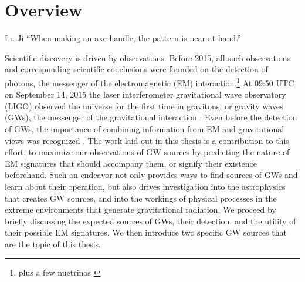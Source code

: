 \chapter[Overview]{Overview} \label{ch:intro}
%
%
%
%
%
%
%
%
\vspace{-16pt} \begin{chapquote}{Lu Ji} \singlespacing ``When making an axe handle, the pattern is near at hand.'' 
 \end{chapquote} \vspace{-8pt}
\noindent\makebox[\linewidth]{\rule{0.5\textwidth}{0.5pt}} \vspace{1pt}

Scientific discovery is driven by observations. Before 2015, all such
observations and corresponding scientific conclusions were founded on the
detection of photons, the messenger of the electromagnetic (EM)
interaction.\footnote{
plus a few nuetrinos
\citep{Haxton:SolarNeutrinos:2013, Hirata:1987, Bionta:1987, ICECUBE:2013:detection}
} 
At 09:50 UTC on September 14, 2015 the laser interferometer gravitational wave
observatory (LIGO) observed the universe for the first time in gravitons, or
gravity waves (GWs), the messenger of the gravitational interaction
\citep{GW150914:2016}. Even before the detection of GWs, the importance of
combining information from EM and gravitational views was recognized
\citep[\textit{e.g.}][]{ThorneBraginsky:1976,Phinney:2009}. The
work laid out in this thesis is a contribution to this effort, to maximize our
observations of GW sources by predicting the nature of EM signatures that
should accompany them, or signify their existence beforehand. Such an endeavor
not only provides ways to find sources of GWs and learn about their operation,
but also drives investigation into the astrophysics that creates GW sources,
and into the workings of physical processes in the extreme environments that
generate gravitational radiation. We proceed by briefly discussing the
expected sources of GWs, their detection, and the utility of their possible EM
signatures. We then introduce two specific GW sources that are the topic of
this thesis.



